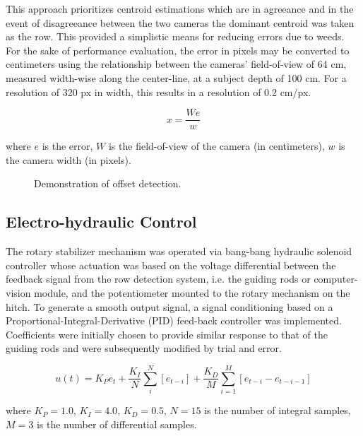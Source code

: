 \documentclass[authoryear]{elsarticle}
\begin{document}
This approach prioritizes centroid estimations which are in agreeance
and in the event of disagreeance between the two cameras the dominant
centroid was taken as the row. This provided a simplistic means for
reducing errors due to weeds. For the sake of performance evaluation,
the error in pixels may be converted to centimeters using the
relationship between the cameras’ field-of-view of 64 cm, measured
width-wise along the center-line, at a subject depth of 100 cm. For a
resolution of 320 px in width, this results in a resolution of 0.2 cm/px.

\begin{equation}
  x = \frac{We}{w}
  \label{eq:px2mm}
\end{equation}
\begin{flushleft}
where $e$ is the error, $W$ is the field-of-view of the camera (in
centimeters), $w$ is the camera width (in pixels).
\end{flushleft}

\begin{figure}
  \centering
  \caption{Demonstration of offset detection.}
  \label{fig:row_estimation}
\end{figure}

\subsection{Electro-hydraulic Control}
The rotary stabilizer mechanism was operated via bang-bang hydraulic
solenoid controller whose actuation was based on the voltage
differential between the feedback signal from the row detection
system, i.e. the guiding rods or computer-vision module, and the
potentiometer mounted to the rotary mechanism on the hitch. 
To generate a smooth output signal, a signal conditioning based on a
Proportional-Integral-Derivative (PID) feed-back controller was
implemented. Coefficients were initially chosen to provide similar
response to that of the guiding rods and were subsequently modified by
trial and error.

\begin{equation}
    u(t) = K_{P}e_{t} + \frac{K_{I}}{N}\displaystyle\sum_i^N \left[
      e_{t-i} \right] +
    \frac{K_{D}}{M}\displaystyle\sum_{i=1}^M \left[e_{t-i}-e_{t-i-1}\right]
  \label{eq:pid}
\end{equation}
\begin{flushleft}
where $K_{P}=1.0$, $K_{I}=4.0$, $K_{D}=0.5$, $N=15$ is the number of integral samples,
$M=3$ is the number of differential samples.
\end{flushleft}
\end{document}

